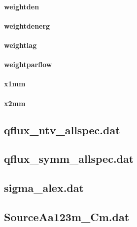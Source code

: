 \paragraph{weightden}

\paragraph{weightdenerg}

\paragraph{weightlag}

\paragraph{weightparflow}

\paragraph{x1mm}

\paragraph{x2mm}

\subsection{qflux\_ntv\_allspec.dat}

\subsection{qflux\_symm\_allspec.dat}

\subsection{sigma\_alex.dat}

\subsection{SourceAa123m\_Cm.dat}

